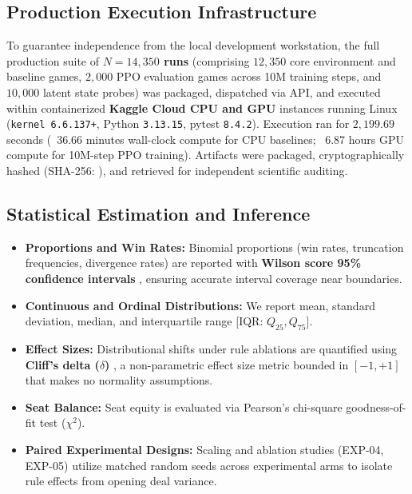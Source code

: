 \documentclass[11pt]{article}
\begin{document}
\subsection{Production Execution Infrastructure}
To guarantee independence from the local development workstation, the full production suite of \textbf{$N = 14,350$ runs} (comprising $12,350$ core environment and baseline games, $2,000$ PPO evaluation games across 10M training steps, and $10,000$ latent state probes) was packaged, dispatched via API, and executed within containerized \textbf{Kaggle Cloud CPU and GPU} instances running Linux (\texttt{kernel 6.6.137+}, Python \texttt{3.13.15}, pytest \texttt{8.4.2}). Execution ran for $2,199.69$ seconds (~$36.66$ minutes wall-clock compute for CPU baselines; ~6.87 hours GPU compute for 10M-step PPO training). Artifacts were packaged, cryptographically hashed (SHA-256: {\small\texttt{}}), and retrieved for independent scientific auditing.

\subsection{Statistical Estimation and Inference}
\begin{itemize}
  \item \textbf{Proportions and Win Rates:} Binomial proportions (win rates, truncation frequencies, divergence rates) are reported with \textbf{Wilson score 95\% confidence intervals} \citep{wilson1927probable}, ensuring accurate interval coverage near boundaries.
  \item \textbf{Continuous and Ordinal Distributions:} We report mean, standard deviation, median, and interquartile range [IQR: $Q_{25}, Q_{75}$].
  \item \textbf{Effect Sizes:} Distributional shifts under rule ablations are quantified using \textbf{Cliff's delta ($\delta$)} \citep{cliff1993dominance}, a non-parametric effect size metric bounded in $[-1, +1]$ that makes no normality assumptions.
  \item \textbf{Seat Balance:} Seat equity is evaluated via Pearson's chi-square goodness-of-fit test ($\chi^2$).
  \item \textbf{Paired Experimental Designs:} Scaling and ablation studies (EXP-04, EXP-05) utilize matched random seeds across experimental arms to isolate rule effects from opening deal variance.
\end{itemize}
\end{document}
